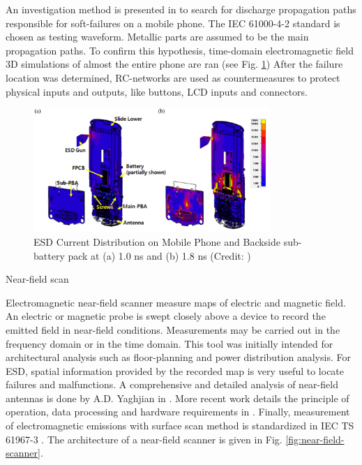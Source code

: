 An investigation method is presented in \cite{softFailMobile} to search for discharge propagation paths responsible for soft-failures on a mobile phone.
The IEC 61000-4-2 standard is chosen as testing waveform.
Metallic parts are assumed to be the main propagation paths.
To confirm this hypothesis, time-domain electromagnetic field 3D simulations of almost the entire phone are ran (see Fig. \ref{fig:mobile-phone-3d-em})
After the failure location was determined, RC-networks are used as countermeasures to protect physical inputs and outputs, like buttons, LCD inputs and connectors.

\begin{figure}[!h]
  \centering
  \includegraphics[width=0.8\textwidth]{src/1/figures/current_distribution_mobile.png}
  \caption{ESD Current Distribution on Mobile Phone and Backside sub-battery pack at (a) 1.0 ns and (b) 1.8 ns (Credit: \cite{softFailMobile})}
  \label{fig:mobile-phone-3d-em}
\end{figure}


Near-field scan

Electromagnetic near-field scanner measure maps of electric and magnetic field.
An electric or magnetic probe is swept closely above a device to record the emitted field in near-field conditions.
Measurements may be carried out in the frequency domain or in the time domain.
This tool was initially intended for architectural analysis such as floor-planning and power distribution analysis.
For ESD, spatial information provided by the recorded map is very useful to locate failures and malfunctions.
A comprehensive and detailed analysis of near-field antennas is done by A.D. Yaghjian in \cite{nfsFirstStudy}.
More recent work details the principle of operation, data processing and hardware requirements in \cite{near-field-scan, planarNFSAntenna, NFSMeasurements, NFScanner}.
Finally, measurement of electromagnetic emissions with surface scan method is standardized in IEC TS 61967-3 \cite{iec61967}.
The architecture of a near-field scanner is given in Fig. \ref{fig:near-field-scanner}.

